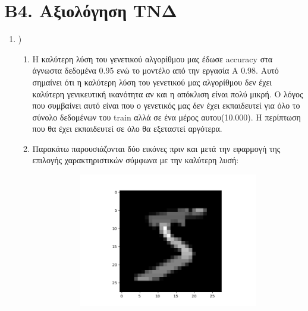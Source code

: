 \documentclass[12pt,a4paper]{article}
\newcommand{\tl}{\textlatin}
\begin{document}
        \section*{Β4. Αξιολόγηση ΤΝΔ}

            \begin{enumerate}
                \item)\\
                    \begin{enumerate}
                        \item Η καλύτερη λύση του γενετικού αλγορίθμου μας έδωσε
                            \tl{accuracy} στα άγνωστα δεδομένα 0.95 ενώ το
                            μοντέλο από την εργασία Α 0.98. Αυτό σημαίνει ότι η
                            καλύτερη λύση του γενετικού μας αλγορίθμου δεν έχει
                            καλύτερη γενικευτική ικανότητα αν και η απόκλιση
                            είναι πολύ μικρή. Ο λόγος που συμβαίνει αυτό είναι
                            που ο γενετικός μας δεν έχει εκπαιδευτεί για όλο το
                            σύνολο δεδομένων του \tl{train} αλλά σε ένα μέρος
                            αυτου(10.000). Η περίπτωση που θα έχει εκπαιδευτεί
                            σε όλο θα εξεταστεί αργότερα.
                            \\
                        \item Παρακάτω παρουσιάζονται δύο εικόνες πριν και μετά
                            την εφαρμογή της επιλογής χαρακτηριστικών σύμφωνα με
                            την καλύτερη λυσή: 
                            \begin{figure}[H]
                                \begin{subfigure}{0.5\textwidth}
                                    \raggedleft
                                    \includegraphics[width=\textwidth]{images/im2.png}

\end{subfigure}
\end{figure}
\end{enumerate}
\end{enumerate}
\end{document}
